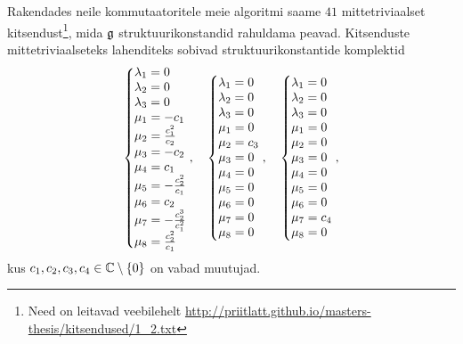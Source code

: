 Rakendades neile kommutaatoritele meie algoritmi saame $41$
mittetriviaalset kitsendust\footnote{Need on leitavad veebilehelt
\url{http://priitlatt.github.io/masters-thesis/kitsendused/1_2.txt}},
mida $\mathfrak{g}$ struktuurikonstandid rahuldama peavad. Kitsenduste
mittetriviaalseteks lahenditeks sobivad struktuurikonstantide komplektid
\renewcommand\arraystretch{1.3}
\begin{align*}
    \left\{ \begin{matrix*}[l]
        \l_1 = 0 \\
        \l_2 = 0 \\
        \l_3 = 0 \\
        \m_1 = -c_1 \\
        \m_2 = \frac{c_1^2}{c_2} \\
        \m_3 = -c_2 \\
        \m_4 = c_1 \\
        \m_5 = -\frac{c_2^2}{c_1} \\
        \m_6 = c_2 \\
        \m_7 = -\frac{c_2^3}{c_1^2} \\
        \m_8 = \frac{c_2^2}{c_1} \\
    \end{matrix*} \right.,
    \quad
    \left\{ \begin{matrix*}[l]
        \l_1 = 0 \\
        \l_2 = 0 \\
        \l_3 = 0 \\
        \m_1 = 0 \\
        \m_2 = c_3 \\
        \m_3 = 0 \\
        \m_4 = 0 \\
        \m_5 = 0 \\
        \m_6 = 0 \\
        \m_7 = 0 \\
        \m_8 = 0 \\
    \end{matrix*} \right.,
    \quad
    \left\{ \begin{matrix*}[l]
        \l_1 = 0 \\
        \l_2 = 0 \\
        \l_3 = 0 \\
        \m_1 = 0 \\
        \m_2 = 0 \\
        \m_3 = 0 \\
        \m_4 = 0 \\
        \m_5 = 0 \\
        \m_6 = 0 \\
        \m_7 = c_4 \\
        \m_8 = 0 \\
    \end{matrix*} \right.,
\end{align*}
\renewcommand\arraystretch{1}
kus $c_1, c_2, c_3, c_4 \in \mathbb{C} \setminus \{0\}$ on vabad muutujad.

